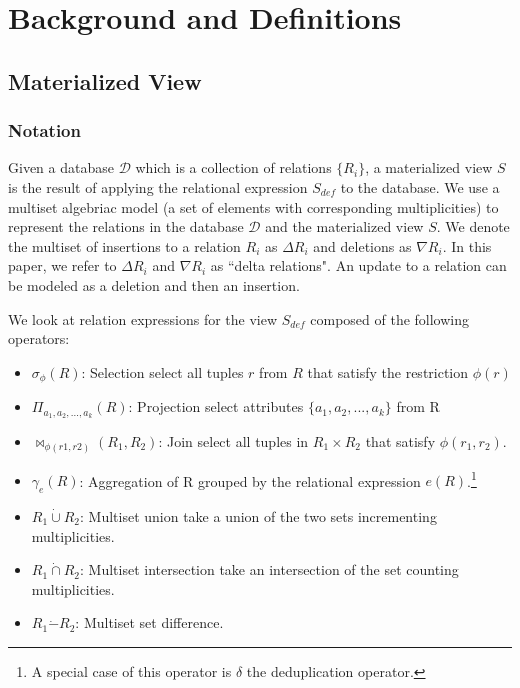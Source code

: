 \section{Background and Definitions}\label{sec-background}
\subsection{Materialized View}\label{subsec-inc}




\subsubsection{Notation} 

Given a database $\mathcal{D}$ which is a collection of relations $\{R_i\}$, a materialized view $S$ is the result of applying the relational expression $S_{def}$ to the database.
We use a multiset algebriac model (a set of elements with corresponding multiplicities) to represent the relations in the database $\mathcal{D}$ and the materialized view $S$.
We denote the multiset of insertions to a relation $R_i$ as $\Delta R_i$ and deletions as $\nabla R_i$.
In this paper, we refer to $\Delta R_i$ and $\nabla R_i$ as ``delta relations".
An update to a relation can be modeled as a deletion and then an insertion.

We look at relation expressions for the view $S_{def}$ composed of the following operators:
\begin{itemize}\vspace{-.45em}
\item $\sigma_{\phi}(R)$: Selection select all tuples $r$ from $R$ that satisfy the restriction $\phi (r)$ \vspace{-.45em}
\item $\Pi_{a_1,a_2,...,a_k}(R)$: Projection select attributes $\{a_1,a_2,...,a_k\}$ from R \vspace{-.45em}
\item $\bowtie_{\phi (r1,r2)}(R_1,R_2)$: Join select all tuples in $R_1 \times R_2$ that satisfy $\phi (r_1,r_2)$.
\item $\gamma_{e}(R)$: Aggregation of R grouped by the relational expression $e(R)$.\footnote{A special case of this operator is $\delta$ the deduplication operator.}\vspace{-.45em}
\item $R_1 \dot{\cup} R_2$: Multiset union take a union of the two sets incrementing multiplicities.
\item $R_1 \dot{\cap} R_2$: Multiset intersection take an intersection of the set counting multiplicities.
\item $R_1 \dot{-} R_2$: Multiset set difference.
\end{itemize}


